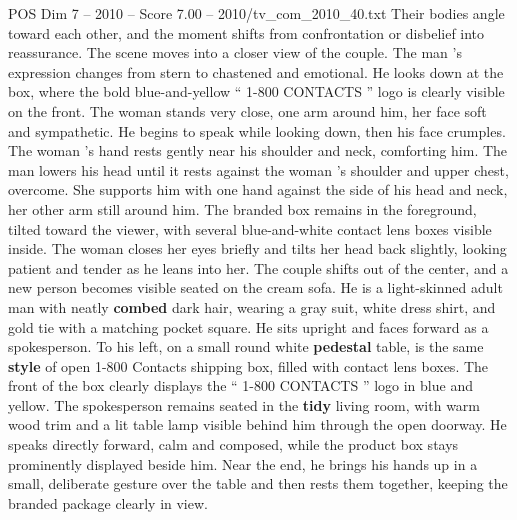 \begin{textsample}{POS Dim 7 – 2010 – Score 7.00 – 2010/tv\_com\_2010\_40.txt}
Their bodies angle toward each other, and the moment shifts from confrontation or disbelief into reassurance.
The scene moves into a closer view of the couple.
The man ’s expression changes from stern to chastened and emotional.
He looks down at the box, where the bold blue-and-yellow “ 1-800 CONTACTS ” logo is clearly visible on the front.
The woman stands very close, one arm around him, her face soft and sympathetic.
He begins to speak while looking down, then his face crumples.
The woman ’s hand rests gently near his shoulder and neck, comforting him.
The man lowers his head until it rests against the woman ’s shoulder and upper chest, overcome.
She supports him with one hand against the side of his head and neck, her other arm still around him.
The branded box remains in the foreground, tilted toward the viewer, with several blue-and-white contact lens boxes visible inside.
The woman closes her eyes briefly and tilts her head back slightly, looking patient and tender as he leans into her.
The couple shifts out of the center, and a new person becomes visible seated on the cream sofa.
He is a light-skinned adult man with neatly \textbf{combed} dark hair, wearing a gray suit, white dress shirt, and gold tie with a matching pocket square.
He sits upright and faces forward as a spokesperson.
To his left, on a small round white \textbf{pedestal} table, is the same \textbf{style} of open 1-800 Contacts shipping box, filled with contact lens boxes.
The front of the box clearly displays the “ 1-800 CONTACTS ” logo in blue and yellow.
The spokesperson remains seated in the \textbf{tidy} living room, with warm wood trim and a lit table lamp visible behind him through the open doorway.
He speaks directly forward, calm and composed, while the product box stays prominently displayed beside him.
Near the end, he brings his hands up in a small, deliberate gesture over the table and then rests them together, keeping the branded package clearly in view.

\end{textsample}
